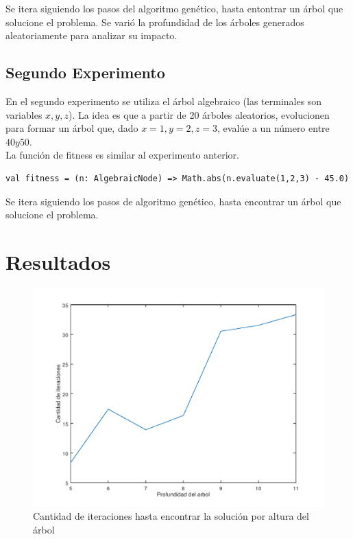 \documentclass[11pt,letterpaper]{article}
\begin{document}
Se itera siguiendo los pasos del algoritmo genético, hasta entontrar un árbol que solucione el problema. Se varió la profundidad de los árboles generados aleatoriamente para analizar su impacto.

\subsection{Segundo Experimento}
En el segundo experimento se utiliza el árbol algebraico (las terminales son variables $x, y, z$). La 
idea es que a partir de 20 árboles aleatorios, evolucionen para formar un árbol que, dado 
$x = 1, y = 2, z = 3$, evalúe a un número entre $40 y 50$.\\

La función de fitness es similar al experimento anterior.
\begin{lstlisting}
val fitness = (n: AlgebraicNode) => Math.abs(n.evaluate(1,2,3) - 45.0)
\end{lstlisting}

Se itera siguiendo los pasos de algoritmo genético, hasta encontrar un árbol que solucione el problema.

\section{Resultados}

\begin{figure}[ht!]
\centering \includegraphics[width=\textwidth]{img/depth.png}
\caption{Cantidad de iteraciones hasta encontrar la solución por altura del árbol} \label{img1}
\end{figure}
\end{document}
